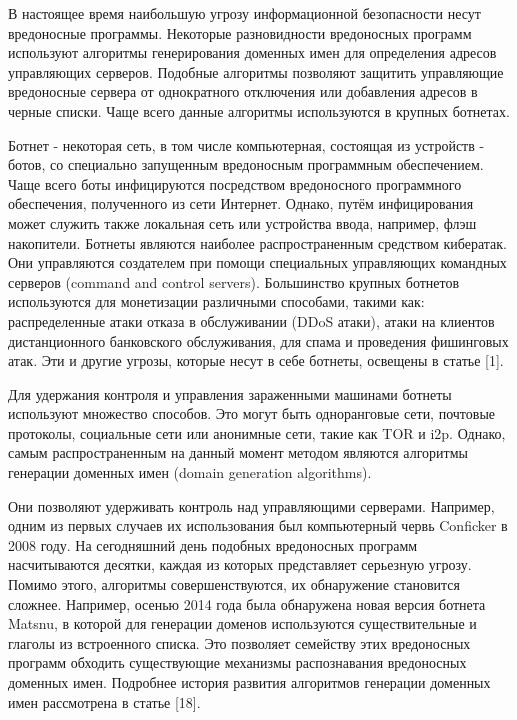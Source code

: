 
В настоящее время наибольшую угрозу информационной безопасности несут вредоносные программы. Некоторые разновидности вредоносных программ используют алгоритмы генерирования доменных имен для определения адресов управляющих серверов. Подобные алгоритмы позволяют защитить управляющие вредоносные сервера от однократного отключения или добавления адресов в черные списки. Чаще всего данные алгоритмы используются в крупных ботнетах. 

Ботнет - некоторая сеть, в том числе компьютерная, состоящая из устройств - ботов, со специально запущенным вредоносным программным обеспечением. Чаще всего боты инфицируются посредством вредоносного программного обеспечения, полученного из сети Интернет. Однако, путём инфицирования может служить также локальная сеть или устройства ввода, например, флэш накопители. Ботнеты являются наиболее распространенным средством кибератак. Они управляются создателем при помощи специальных управляющих командных серверов (command and control servers). Большинство крупных ботнетов используются для монетизации различными способами, такими как: распределенные атаки отказа в обслуживании (DDoS атаки), атаки на клиентов дистанционного банковского обслуживания, для спама и проведения фишинговых атак. Эти и другие угрозы, которые несут в себе ботнеты, освещены в статье [1].

Для удержания контроля и управления зараженными машинами ботнеты используют множество способов. Это могут быть одноранговые сети, почтовые протоколы, социальные сети или анонимные сети, такие как TOR и i2p.
Однако, самым распространенным на данный момент методом являются алгоритмы генерации доменных имен (domain generation algorithms).

Они позволяют удерживать контроль над управляющими серверами. Например, одним из первых случаев их использования был компьютерный червь Conficker в 2008 году. На сегодняшний день подобных вредоносных программ насчитываются десятки, каждая из которых представляет серьезную угрозу. Помимо этого, алгоритмы совершенствуются, их обнаружение становится сложнее. Например, осенью 2014 года была обнаружена новая версия ботнета Matsnu, в которой для генерации доменов используются существительные и глаголы из встроенного списка. Это позволяет семейству этих вредоносных программ обходить существующие механизмы распознавания вредоносных доменных имен. Подробнее история развития алгоритмов генерации доменных имен рассмотрена в статье [18].

